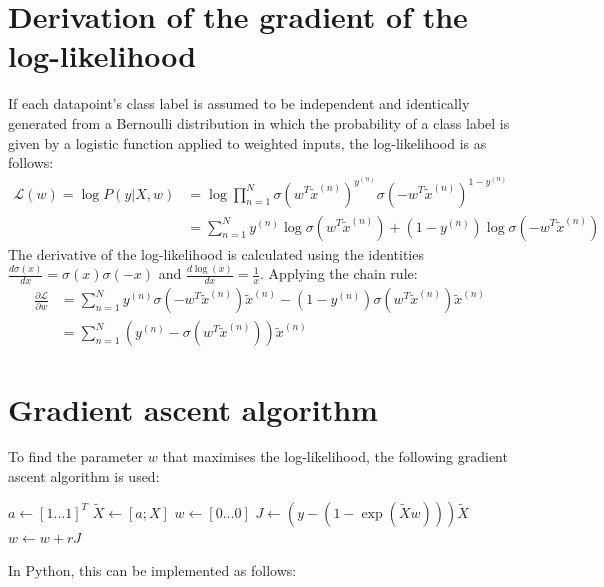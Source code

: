 \documentclass[a4paper]{article}
\begin{document}
    \section{Derivation of the gradient of the log-likelihood}\label{sec:gradient-derivation}
    If each datapoint's class label is assumed to be independent and identically generated from a Bernoulli distribution
    in which the probability of a class label is given by a logistic function applied to weighted inputs, the
    log-likelihood is as follows:
    \begin{align*}
        \mathcal{L}(w) = \log P(y|X, w) &= \log \prod_{n=1}^{N} \sigma(w^T \tilde{x}^{(n)})^{y^{(n)}}\sigma(-w^T \tilde{x}^{(n)})^{1-y^{(n)}} \\
        &= \sum_{n=1}^{N} y^{(n)} \log\sigma(w^T \tilde{x}^{(n)}) + (1-y^{(n)}) \log\sigma(-w^T \tilde{x}^{(n)})
    \end{align*}
    The derivative of the log-likelihood is calculated using the identities $\frac{d\sigma(x)}{dx} = \sigma(x)\sigma(-x)$
    and $\frac{d\log(x)}{dx} = \frac{1}{x}$. Applying the chain rule:
    \begin{align*}
        \frac{\partial \mathcal{L}}{\partial w} &= \sum_{n=1}^{N} y^{(n)} \sigma(-w^T \tilde{x}^{(n)}) \tilde{x}^{(n)} - (1-y^{(n)}) \sigma(w^T \tilde{x}^{(n)})  \tilde{x}^{(n)}
        \\ &= \sum_{n=1}^{N} \left(y^{(n)} - \sigma(w^T \tilde{x}^{(n)}) \right)  \tilde{x}^{(n)}
    \end{align*}

    \section{Gradient ascent algorithm}\label{sec:gradient-ascent-algorithm}
    To find the parameter $w$ that maximises the log-likelihood, the following gradient ascent algorithm is used:

    \begin{algorithmic}[1]
            \State $a \gets [1 \dots 1]^T$
            \State $\tilde{X} \gets [a ; X]$
            \State $w \gets [0 \dots 0]$
                \State $J \gets (y - (1 - \exp(\tilde{X} w))) \tilde{X}$
                \State $w \gets w + rJ$
            \EndFor
        \EndProcedure
    \end{algorithmic}

    In Python, this can be implemented as follows:
\end{document}
